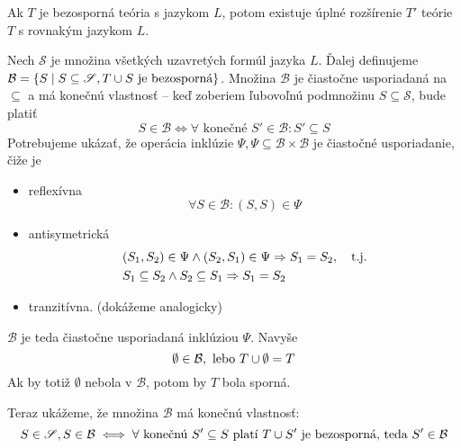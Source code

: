 \stopFIXME

\begin{veta}[Lindenbaum]
    Ak $T$ je bezosporná teória s jazykom $L$, potom existuje úplné
    rozšírenie $T'$ teórie $T$ s rovnakým jazykom $L$.
\end{veta}

\begin{dokaz}
    Nech $\mathscr{S}$ je množina všetkých uzavretých formúl jazyka $L$.
    Ďalej definujeme
    $\mathcal{B} = \{ S \mid S \subseteq \mathscr{S}, T \cup S
        \mbox{ je bezosporná}\}$.
    Množina $\mathcal{B}$ je čiastočne usporiadaná na $\subseteq$ a
    má konečnú vlastnosť -- keď zoberiem ľubovoľnú podmnožinu
    $S \subseteq \mathscr{S}$, bude platiť
    \begin{equation*}
        S \in \mathcal{B} \iff \forall \mbox{ konečné } S' \in
        \mathcal{B}: S' \subseteq S
    \end{equation*}
     Potrebujeme ukázať, že operácia inklúzie $\Psi, \Psi \subseteq
     \mathcal{B}\times\mathcal{B}$ je čiastočné usporiadanie, čiže je
    \begin{itemize}
        \item reflexívna
            \begin{equation*}
                \forall S \in \mathcal{B}: (S,S) \in \Psi
            \end{equation*}
        \item antisymetrická
            \begin{align*}
                &(S_1,S_2) \in \Psi \land (S_2,S_1) \in \Psi
                    \Rightarrow S_1 = S_2, \quad \mbox{t.j.} \\
                &S_1 \subseteq S_2 \land S_2 \subseteq S_1 \Rightarrow S_1 = S_2
            \end{align*}
        \item tranzitívna. (dokážeme analogicky)
    \end{itemize}
    $\mathcal{B}$ je teda čiastočne usporiadaná inklúziou $\Psi$.
    Navyše
    \begin{equation*}
        \emptyset \in \mathcal{B}, \mbox{ lebo } T \cup \emptyset = T
    \end{equation*}
    Ak by totiž $\emptyset$ nebola v $\mathcal{B}$, potom by $T$ bola sporná.

    Teraz ukážeme, že množina $\mathcal{B}$ má konečnú vlastnosť:
    \begin{equation*}
        S \in \mathscr{S}, S \in \mathcal{B} \iff \forall \textrm{
        konečnú }S' \subseteq S \textrm{ platí } T \cup S' 
            \textrm{ je bezosporná, teda }S' \in \mathcal{B}
    \end{equation*}
   

\end{dokaz}

